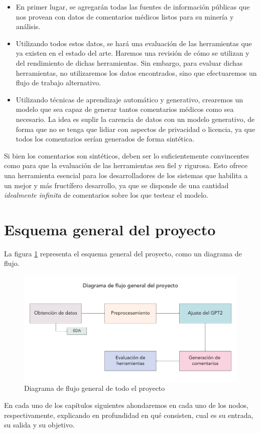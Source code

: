 \begin{itemize}
	\item En primer lugar, se agregarán todas las fuentes de información públicas que nos provean con datos de comentarios médicos listos para su minería y análisis.
	\item Utilizando todos estos datos, se hará una evaluación de las herramientas que ya existen en el estado del arte. Haremos una revisión de cómo se utilizan y del rendimiento de dichas herramientas. Sin embargo, para evaluar dichas herramientas, no utilizaremos los datos encontrados, sino que efectuaremos un flujo de trabajo alternativo. 
	\item Utilizando técnicas de aprendizaje automático y generativo, crearemos un modelo que sea capaz de generar tantos comentarios médicos como sea necesario. La idea es suplir la carencia de datos con un modelo generativo, de forma que no se tenga que lidiar con aspectos de privacidad o licencia, ya que todos los comentarios serían generados de forma sintética. 
\end{itemize}



Si bien los comentarios son sintéticos, deben ser lo suficientemente convincentes como para que la evaluación de las herramientas sea fiel y rigurosa. Esto ofrece una herramienta esencial para los desarrolladores de los sistemas que habilita a un mejor y más fructífero desarrollo, ya que se disponde de una cantidad \textit{idealmente infinita} de comentarios sobre los que testear el modelo.

\section{Esquema general del proyecto}

La figura \ref{fig:general-diagram} representa el esquema general del proyecto, como un diagrama de flujo.
\begin{figure}[h]
	\centering
	\includegraphics[width=.9\textwidth]{media/general-diagram.pdf}
	\caption{Diagrama de flujo general de todo el proyecto}
	\label{fig:general-diagram}
\end{figure}

En cada uno de los capítulos siguientes ahondaremos en cada uno de los nodos, respectivamente, explicando en profundidad en qué consisten, cual es su entrada, su salida y su objetivo.

